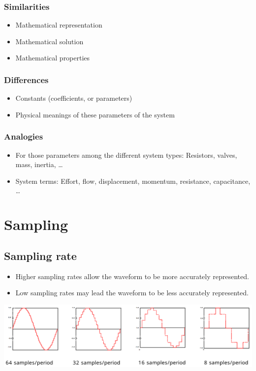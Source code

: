 \documentclass[11pt]{article}
\begin{document}
\subsubsection{Similarities}
\label{sec:org6516db4}
\begin{itemize}
\item Mathematical representation
\item Mathematical solution
\item Mathematical properties
\end{itemize}
\subsubsection{Differences}
\label{sec:orga4e8f30}
\begin{itemize}
\item Constants (coefficients, or parameters)
\item Physical meanings of these parameters of the system
\end{itemize}
\subsubsection{Analogies}
\label{sec:orgad7b3b7}
\begin{itemize}
\item For those parameters among the different system types: Resistors, valves, mass, inertia, \ldots{}
\item System terms: Effort, flow, displacement, momentum, resistance, capacitance, \ldots{}
\end{itemize}
\section{Sampling}
\label{sec:org04ba19a}

\subsection{Sampling rate}
\label{sec:org6175b5e}
\begin{itemize}
\item Higher sampling rates allow the waveform to be more accurately represented.
\item Low sampling rates may lead the waveform to be less accurately represented.
\end{itemize}

\begin{center}
\includegraphics[width=.9\linewidth]{./images/sampling-rate-comparison-graphs.png}
\end{center}
\end{document}
